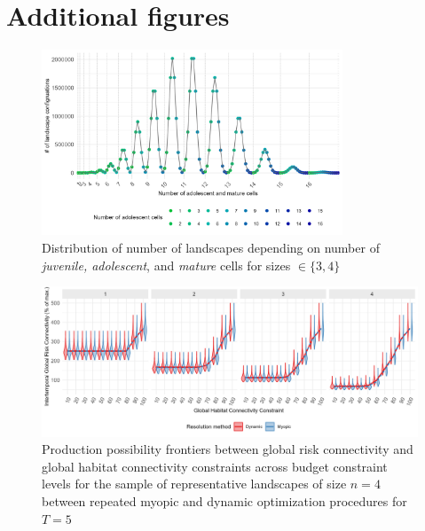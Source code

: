 \clearpage

\section{Additional figures}

\begin{figure}[H]
    \centering
    \includegraphics[width = 0.8\textwidth]{figures/wildland/distribution_cases_4.png}
    \caption{Distribution of number of landscapes depending on number of \textit{juvenile, adolescent}, and \textit{mature} cells for sizes $\in \{3,4\}$}
    \label{fig:appendix_distribution}
\end{figure}

\begin{figure}[H]
    \centering
    \includegraphics[width=\textwidth]{figures/wildland/dynamic_v_myopic_fpp.jpg}
    \caption{Production possibility frontiers between global risk connectivity and global habitat connectivity constraints across budget constraint levels for the sample of representative landscapes of size $n=4$ between repeated myopic and dynamic optimization procedures for $T=5$}
    \label{fig:appendix_fpp_dyn_myopic}
\end{figure}
\clearpage

